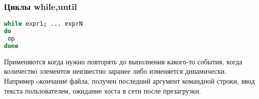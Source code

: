 \begin{frame}[fragile]
\frametitle{Циклы while,until}
\begin{lstlisting}[language=sh,frame=single]
while expr1; ... exprN
do
 op
done
\end{lstlisting}
Применяются когда нужно повторять до выполнения какого-то  \alert{события}, когда \alert{количество элементов неизвестно} заранее либо изменяется динамически. \\
Например oкончание файла, получен последний аргумент командной строки, ввод текста пользователем, ожидание хоста в сети после презагрузки. 
\end{frame}
